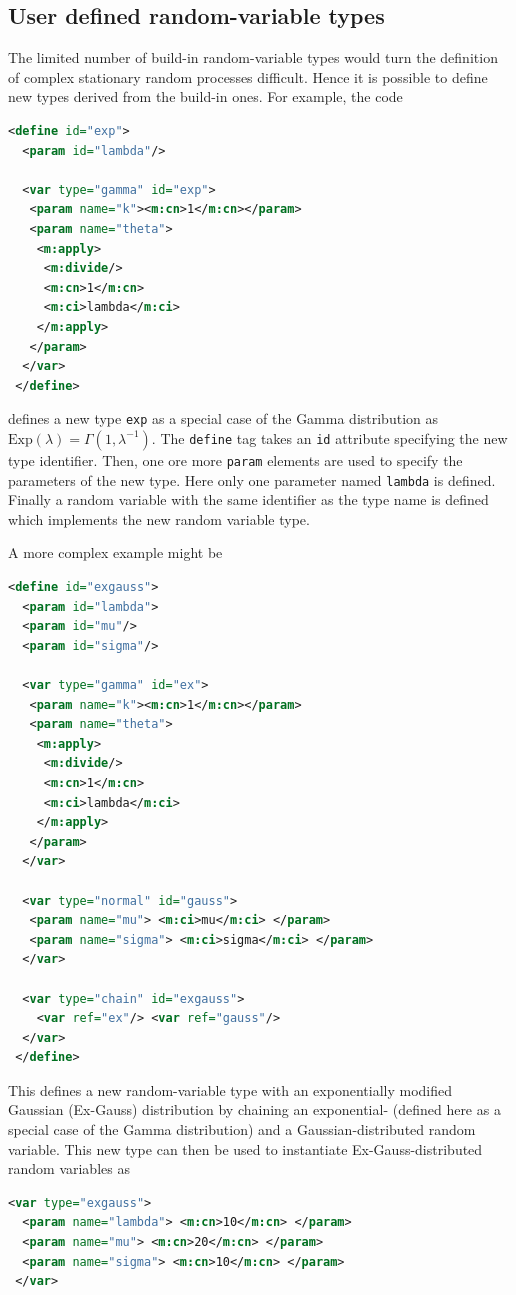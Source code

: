 \documentclass[a4paper, 10pt]{paper}
\newcommand{\code}[1]{\texttt{#1}}
\begin{document}
\subsection{User defined random-variable types}
The limited number of build-in random-variable types would turn the definition of complex stationary random
processes difficult. Hence it is possible to define new types derived from the build-in ones. For example,
the code 
\begin{lstlisting}[language=XML]
 <define id="exp">
  <param id="lambda"/>

  <var type="gamma" id="exp">
   <param name="k"><m:cn>1</m:cn></param>
   <param name="theta">
    <m:apply>
     <m:divide/>
     <m:cn>1</m:cn>
     <m:ci>lambda</m:ci>
    </m:apply>
   </param>
  </var>
 </define>
\end{lstlisting}
defines a new type \code{exp} as a special case of the Gamma distribution as
$\text{Exp}(\lambda) = \Gamma(1,\lambda^{-1})$. The \code{define} tag takes an \code{id} 
attribute specifying the new type identifier. Then, one ore more \code{param} elements are
used to specify the parameters of the new type. 
Here only one parameter named \code{lambda} is defined. Finally a random variable with the same
identifier as the type name is defined which implements the new random variable type.

A more complex example might be
\begin{lstlisting}[language=XML]
 <define id="exgauss">
  <param id="lambda">
  <param id="mu"/>
  <param id="sigma"/>

  <var type="gamma" id="ex">
   <param name="k"><m:cn>1</m:cn></param>
   <param name="theta">
    <m:apply>
     <m:divide/>
     <m:cn>1</m:cn>
     <m:ci>lambda</m:ci>
    </m:apply>
   </param>
  </var>

  <var type="normal" id="gauss">
   <param name="mu"> <m:ci>mu</m:ci> </param>
   <param name="sigma"> <m:ci>sigma</m:ci> </param>
  </var>

  <var type="chain" id="exgauss">
    <var ref="ex"/> <var ref="gauss"/>
  </var>
 </define>
\end{lstlisting}

This defines a new random-variable type with an exponentially modified Gaussian (Ex-Gauss) 
distribution by chaining an exponential- (defined here as a special case of the Gamma 
distribution) and a Gaussian-distributed random variable. This new type can then be used
to instantiate Ex-Gauss-distributed random variables as
\begin{lstlisting}[language=XML]
 <var type="exgauss">
  <param name="lambda"> <m:cn>10</m:cn> </param>
  <param name="mu"> <m:cn>20</m:cn> </param>
  <param name="sigma"> <m:cn>10</m:cn> </param>
 </var>
\end{lstlisting}
\end{document}
